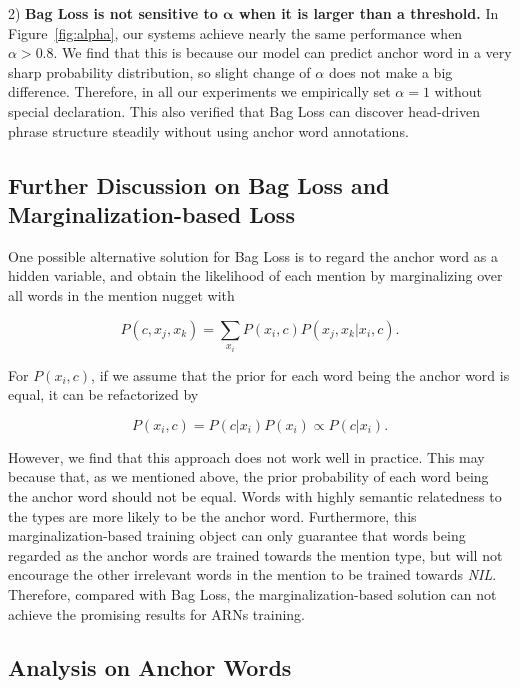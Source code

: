 \documentclass[11pt,a4paper]{article}
\begin{document}
2) \textbf{Bag Loss is not sensitive to $\bm \alpha$ when it is larger than a threshold.} In Figure~\ref{fig:alpha}, our systems achieve nearly the same performance when  $\alpha>0.8$. We find that this is because our model can predict anchor word in a very sharp probability distribution, so slight change of $\alpha$ does not make a big difference. Therefore, in all our experiments we empirically set $\alpha=1$ without special declaration. This also verified that Bag Loss can discover head-driven phrase structure steadily without using anchor word annotations.

\subsection{Further Discussion on Bag Loss and Marginalization-based Loss}
One possible alternative solution for Bag Loss is to regard the anchor word as a hidden variable, and obtain the likelihood of each mention by marginalizing over all words in the mention nugget with

\begin{small}
\begin{equation}
P(c,x_j,x_k) = \sum_{x_i} P(x_i,c)P(x_j,x_k|x_i,c).
\end{equation}
\end{small}For $P(x_i,c)$, if we assume that the prior for each word being the anchor word is equal, it can be refactorized by

\begin{small}
\begin{equation}
P(x_i,c) = P(c|x_i)P(x_i) \propto P(c|x_i).
\end{equation}
\end{small}

However, we find that this approach does not work well in practice. This may because that, as we mentioned above, the prior probability of each word being the anchor word should not be equal. Words with highly semantic relatedness to the types are more likely to be the anchor word. Furthermore, this marginalization-based training object can only guarantee that words being regarded as the  anchor words are trained towards the mention type, but will not encourage the other irrelevant words in the mention to be trained towards \emph{NIL}. Therefore, compared with Bag Loss, the marginalization-based solution can not achieve the promising results for ARNs training.

\subsection{Analysis on Anchor Words}
\end{document}
